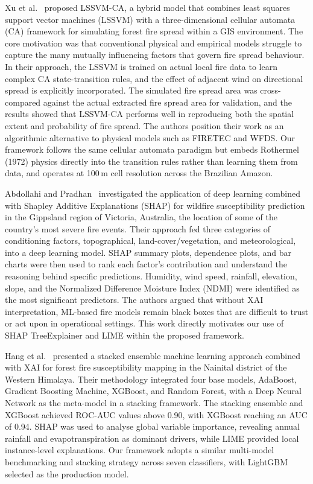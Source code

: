 \documentclass[12pt,a4paper]{article}
\begin{document}
Xu et al.~\cite{xu2022} proposed LSSVM-CA, a hybrid model that combines least squares support vector machines (LSSVM) with a three-dimensional cellular automata (CA) framework for simulating forest fire spread within a GIS environment. The core motivation was that conventional physical and empirical models struggle to capture the many mutually influencing factors that govern fire spread behaviour. In their approach, the LSSVM is trained on actual local fire data to learn complex CA state-transition rules, and the effect of adjacent wind on directional spread is explicitly incorporated. The simulated fire spread area was cross-compared against the actual extracted fire spread area for validation, and the results showed that LSSVM-CA performs well in reproducing both the spatial extent and probability of fire spread. The authors position their work as an algorithmic alternative to physical models such as FIRETEC and WFDS. Our framework follows the same cellular automata paradigm but embeds Rothermel (1972) physics directly into the transition rules rather than learning them from data, and operates at 100\,m cell resolution across the Brazilian Amazon.

Abdollahi and Pradhan~\cite{abdollahi2023} investigated the application of deep learning combined with Shapley Additive Explanations (SHAP) for wildfire susceptibility prediction in the Gippsland region of Victoria, Australia, the location of some of the country's most severe fire events. Their approach fed three categories of conditioning factors, topographical, land-cover/vegetation, and meteorological, into a deep learning model. SHAP summary plots, dependence plots, and bar charts were then used to rank each factor's contribution and understand the reasoning behind specific predictions. Humidity, wind speed, rainfall, elevation, slope, and the Normalized Difference Moisture Index (NDMI) were identified as the most significant predictors. The authors argued that without XAI interpretation, ML-based fire models remain black boxes that are difficult to trust or act upon in operational settings. This work directly motivates our use of SHAP TreeExplainer and LIME within the proposed framework.

Hang et al.~\cite{hang2024} presented a stacked ensemble machine learning approach combined with XAI for forest fire susceptibility mapping in the Nainital district of the Western Himalaya. Their methodology integrated four base models, AdaBoost, Gradient Boosting Machine, XGBoost, and Random Forest, with a Deep Neural Network as the meta-model in a stacking framework. The stacking ensemble and XGBoost achieved ROC-AUC values above 0.90, with XGBoost reaching an AUC of 0.94. SHAP was used to analyse global variable importance, revealing annual rainfall and evapotranspiration as dominant drivers, while LIME provided local instance-level explanations. Our framework adopts a similar multi-model benchmarking and stacking strategy across seven classifiers, with LightGBM selected as the production model.
\end{document}
